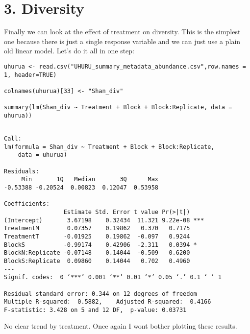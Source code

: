 \documentclass[11pt]{article}
\begin{document}
\section*{3. Diversity}
\label{sec:org33278a9}

Finally we can look at the effect of treatment on diversity. This is the simplest one because there is just a single response variable and we can just use a plain old linear model. Let's do it all in one step:

\begin{verbatim}
uhurua <- read.csv("UHURU_summary_metadata_abundance.csv",row.names = 1, header=TRUE)

colnames(uhurua)[33] <- "Shan_div"

summary(lm(Shan_div ~ Treatment + Block + Block:Replicate, data = uhurua))

\end{verbatim}

\begin{verbatim}

Call:
lm(formula = Shan_div ~ Treatment + Block + Block:Replicate, 
    data = uhurua)

Residuals:
     Min       1Q   Median       3Q      Max 
-0.53388 -0.20524  0.00823  0.12047  0.53958 

Coefficients:
                 Estimate Std. Error t value Pr(>|t|)    
(Intercept)       3.67198    0.32434  11.321 9.22e-08 ***
TreatmentM        0.07357    0.19862   0.370   0.7175    
TreatmentT       -0.01925    0.19862  -0.097   0.9244    
BlockS           -0.99174    0.42906  -2.311   0.0394 *  
BlockN:Replicate -0.07148    0.14044  -0.509   0.6200    
BlockS:Replicate  0.09860    0.14044   0.702   0.4960    
---
Signif. codes:  0 ‘***’ 0.001 ‘**’ 0.01 ‘*’ 0.05 ‘.’ 0.1 ‘ ’ 1

Residual standard error: 0.344 on 12 degrees of freedom
Multiple R-squared:  0.5882,	Adjusted R-squared:  0.4166 
F-statistic: 3.428 on 5 and 12 DF,  p-value: 0.03731
\end{verbatim}

No clear trend by treatment. Once again I wont bother plotting these results.
\end{document}
